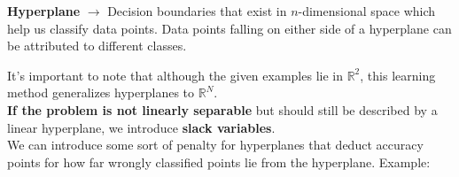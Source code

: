 \documentclass[english, 10pt]{article}
\begin{document}
\hfill \begin{tcolorbox}[title=Definition:,colframe=red!75!black,colback=red!5!white,arc=0pt,fonttitle=\bfseries]
\textbf{Hyperplane} $\rightarrow$ Decision boundaries that exist in $n$-dimensional space which help us classify data points. Data points falling on either side of a hyperplane can be attributed to different classes.
\end{tcolorbox}

\hfill \break It's important to note that although the given examples lie in $\mathbb{R}^2$, this learning method generalizes hyperplanes to $\mathbb{R}^N$.\\

\textbf{If the problem is not linearly separable} but should still be described by a linear hyperplane, we introduce \textbf{slack variables}.\\

We can introduce some sort of penalty for hyperplanes that deduct accuracy points for how far wrongly classified points lie from the hyperplane. Example:\\\\
\end{document}
